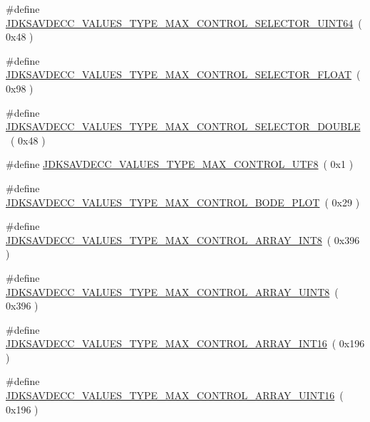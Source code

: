 \begin{DoxyCompactItemize}
\item 
\#define \hyperlink{group__values__type__max_gafbbde29178ceea5b133f4a54f804997a}{J\+D\+K\+S\+A\+V\+D\+E\+C\+C\+\_\+\+V\+A\+L\+U\+E\+S\+\_\+\+T\+Y\+P\+E\+\_\+\+M\+A\+X\+\_\+\+C\+O\+N\+T\+R\+O\+L\+\_\+\+S\+E\+L\+E\+C\+T\+O\+R\+\_\+\+U\+I\+N\+T64}~( 0x48 )
\item 
\#define \hyperlink{group__values__type__max_gaef26c8d6c77e1f43d40f08b5a19a4df3}{J\+D\+K\+S\+A\+V\+D\+E\+C\+C\+\_\+\+V\+A\+L\+U\+E\+S\+\_\+\+T\+Y\+P\+E\+\_\+\+M\+A\+X\+\_\+\+C\+O\+N\+T\+R\+O\+L\+\_\+\+S\+E\+L\+E\+C\+T\+O\+R\+\_\+\+F\+L\+O\+AT}~( 0x98 )
\item 
\#define \hyperlink{group__values__type__max_gada46e8c2a8e3f790380dbea91f061fc0}{J\+D\+K\+S\+A\+V\+D\+E\+C\+C\+\_\+\+V\+A\+L\+U\+E\+S\+\_\+\+T\+Y\+P\+E\+\_\+\+M\+A\+X\+\_\+\+C\+O\+N\+T\+R\+O\+L\+\_\+\+S\+E\+L\+E\+C\+T\+O\+R\+\_\+\+D\+O\+U\+B\+LE}~( 0x48 )
\item 
\#define \hyperlink{group__values__type__max_gab76f88155071cbee87ccaf8c18dc3a75}{J\+D\+K\+S\+A\+V\+D\+E\+C\+C\+\_\+\+V\+A\+L\+U\+E\+S\+\_\+\+T\+Y\+P\+E\+\_\+\+M\+A\+X\+\_\+\+C\+O\+N\+T\+R\+O\+L\+\_\+\+U\+T\+F8}~( 0x1 )
\item 
\#define \hyperlink{group__values__type__max_ga5cf7dc759f9d547473afbe5b5893cfa3}{J\+D\+K\+S\+A\+V\+D\+E\+C\+C\+\_\+\+V\+A\+L\+U\+E\+S\+\_\+\+T\+Y\+P\+E\+\_\+\+M\+A\+X\+\_\+\+C\+O\+N\+T\+R\+O\+L\+\_\+\+B\+O\+D\+E\+\_\+\+P\+L\+OT}~( 0x29 )
\item 
\#define \hyperlink{group__values__type__max_gad3c46000f2c0b92a20ac461519e589b7}{J\+D\+K\+S\+A\+V\+D\+E\+C\+C\+\_\+\+V\+A\+L\+U\+E\+S\+\_\+\+T\+Y\+P\+E\+\_\+\+M\+A\+X\+\_\+\+C\+O\+N\+T\+R\+O\+L\+\_\+\+A\+R\+R\+A\+Y\+\_\+\+I\+N\+T8}~( 0x396 )
\item 
\#define \hyperlink{group__values__type__max_ga33093e19942a36a9cc017df54c77c6ff}{J\+D\+K\+S\+A\+V\+D\+E\+C\+C\+\_\+\+V\+A\+L\+U\+E\+S\+\_\+\+T\+Y\+P\+E\+\_\+\+M\+A\+X\+\_\+\+C\+O\+N\+T\+R\+O\+L\+\_\+\+A\+R\+R\+A\+Y\+\_\+\+U\+I\+N\+T8}~( 0x396 )
\item 
\#define \hyperlink{group__values__type__max_ga6b7b206e721b41ac2357d0fe6486b62e}{J\+D\+K\+S\+A\+V\+D\+E\+C\+C\+\_\+\+V\+A\+L\+U\+E\+S\+\_\+\+T\+Y\+P\+E\+\_\+\+M\+A\+X\+\_\+\+C\+O\+N\+T\+R\+O\+L\+\_\+\+A\+R\+R\+A\+Y\+\_\+\+I\+N\+T16}~( 0x196 )
\item 
\#define \hyperlink{group__values__type__max_gabd33e6b9cee48d04cd45afcc35ea63e9}{J\+D\+K\+S\+A\+V\+D\+E\+C\+C\+\_\+\+V\+A\+L\+U\+E\+S\+\_\+\+T\+Y\+P\+E\+\_\+\+M\+A\+X\+\_\+\+C\+O\+N\+T\+R\+O\+L\+\_\+\+A\+R\+R\+A\+Y\+\_\+\+U\+I\+N\+T16}~( 0x196 )

\end{DoxyCompactItemize}
